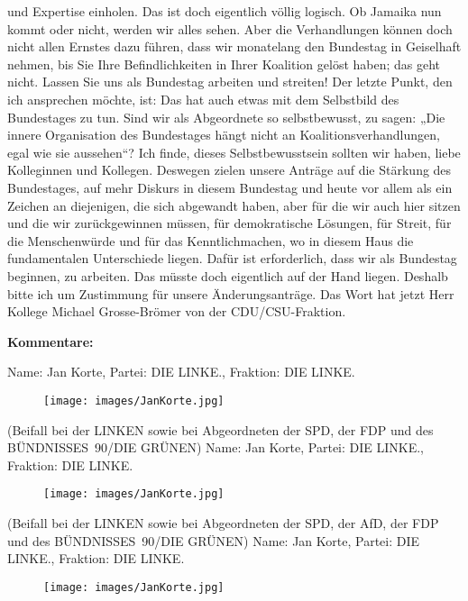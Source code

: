 \documentclass[10pt, a4paper]{report}
\begin{document}
und Expertise einholen. Das ist doch eigentlich völlig logisch. Ob Jamaika nun kommt oder nicht, werden wir alles sehen. Aber die Verhandlungen können doch nicht allen Ernstes dazu führen, dass wir monatelang den Bundestag in Geiselhaft nehmen, bis Sie Ihre Befindlichkeiten in Ihrer Koalition gelöst haben; das geht nicht. Lassen Sie uns als Bundestag arbeiten und streiten! Der letzte Punkt, den ich ansprechen möchte, ist: Das hat auch etwas mit dem Selbstbild des Bundestages zu tun. Sind wir als Abgeordnete so selbstbewusst, zu sagen: „Die innere Organisation des Bundestages hängt nicht an Koalitionsverhandlungen, egal wie sie aussehen“? Ich finde, dieses Selbstbewusstsein sollten wir haben, liebe Kolleginnen und Kollegen. Deswegen zielen unsere Anträge auf die Stärkung des Bundestages, auf mehr Diskurs in diesem Bundestag und heute vor allem als ein Zeichen an diejenigen, die sich abgewandt haben, aber für die wir auch hier sitzen und die wir zurückgewinnen müssen, für demokratische Lösungen, für Streit, für die Menschenwürde und für das Kenntlichmachen, wo in diesem Haus die fundamentalen Unterschiede liegen. Dafür ist erforderlich, dass wir als Bundestag beginnen, zu arbeiten. Das müsste doch eigentlich auf der Hand liegen. Deshalb bitte ich um Zustimmung für unsere Änderungsanträge. Das Wort hat jetzt Herr Kollege Michael Grosse-Brömer von der CDU/CSU-Fraktion. 

\textbf{Kommentare:}

Name: Jan Korte, Partei: DIE LINKE., Fraktion: DIE LINKE.

\begin{figure}[!ht]
\texttt{[image: images/JanKorte.jpg]}
\end{figure}


(Beifall bei der LINKEN sowie bei Abgeordneten der SPD, der FDP und des BÜNDNISSES 90/DIE GRÜNEN)
Name: Jan Korte, Partei: DIE LINKE., Fraktion: DIE LINKE.

\begin{figure}[!ht]
\texttt{[image: images/JanKorte.jpg]}
\end{figure}


(Beifall bei der LINKEN sowie bei Abgeordneten der SPD, der AfD, der FDP und des BÜNDNISSES 90/DIE GRÜNEN)
Name: Jan Korte, Partei: DIE LINKE., Fraktion: DIE LINKE.

\begin{figure}[!ht]
\texttt{[image: images/JanKorte.jpg]}
\end{figure}
\end{document}
